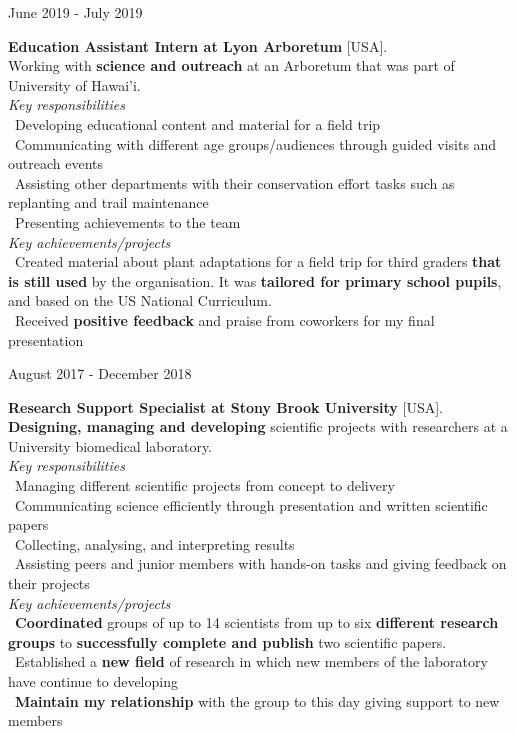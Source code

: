 \documentclass[11pt, a4paper]{article}
\begin{document}
\begin{flushright} June 2019 - July 2019
\end{flushright}
\textbf{Education Assistant Intern at Lyon Arboretum} [USA].
\\
Working with \textbf{science and outreach} at an Arboretum that was part of University of Hawai’i.
\\
\textit{Key responsibilities}
\\
\textbullet \ Developing educational content and material for a field trip 
\\
\textbullet \ Communicating with different age groups/audiences through guided visits and outreach events
\\
\textbullet \ Assisting other departments with their conservation effort tasks such as replanting and trail maintenance
\\
\textbullet \ Presenting achievements to the team
\\
\textit{Key achievements/projects}
\\
\textbullet \ Created material about plant adaptations for a field trip for third graders \textbf{that is still used} by the organisation. It was \textbf{tailored for primary school pupils}, and based on the US National Curriculum. 
\\
\textbullet \ Received \textbf{positive feedback} and praise from coworkers for my final presentation
\\[0.1cm]

\begin{flushright} August 2017 - December 2018
\end{flushright}
\textbf{Research Support Specialist at Stony Brook University} [USA].
\\
\textbf{Designing, managing and developing} scientific projects with researchers at a University biomedical laboratory.
\\
\textit{Key responsibilities}
\\
\textbullet \ Managing different scientific projects from concept to delivery 
\\
\textbullet \ Communicating science efficiently through presentation and written scientific papers
\\
\textbullet \ Collecting, analysing, and interpreting results
\\
\textbullet \ Assisting peers and junior members with hands-on tasks and giving feedback on their projects 
\\
\textit{Key achievements/projects}
\\
\textbullet \ \textbf{Coordinated} groups of up to 14 scientists from up to six \textbf{different research groups} to \textbf{successfully complete and publish} two scientific papers. 
\\
\textbullet \ Established a \textbf{new field} of research in which new members of the laboratory have continue to developing
\\
\textbullet \ \textbf{Maintain my relationship} with the group to this day giving support to new members
\end{document}
